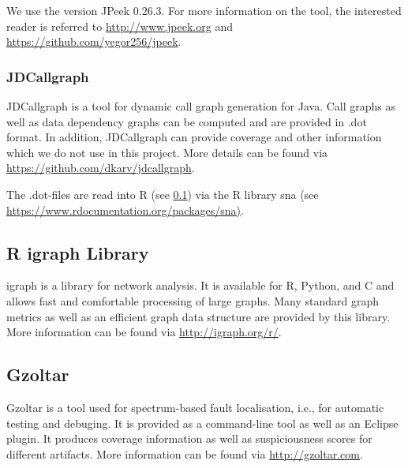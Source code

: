\documentclass{scrartcl}
\begin{document}
We use the version JPeek 0.26.3. For more information on the tool, the
interested reader is referred to \url{http://www.jpeek.org} and
\url{https://github.com/yegor256/jpeek}.

\subsubsection{JDCallgraph}
\label{sec:jdcallgraph}

JDCallgraph is a tool for dynamic call graph generation for Java. Call graphs as
well as data dependency graphs can be computed and are provided in .dot format.
In addition, JDCallgraph can provide coverage and other information which we do
not use in this project. More details can be found via
\url{https://github.com/dkarv/jdcallgraph}.

The .dot-files are read into R (see \ref{sec:igraph}) via the R library sna (see
\url{https://www.rdocumentation.org/packages/sna)}.

\subsection{R igraph Library}
\label{sec:igraph}

igraph is a library for network analysis. It is available for R, Python, and C
and allows fast and comfortable processing of large graphs. Many standard graph
metrics as well as an efficient graph data structure  are provided by this
library. More information can be found via \url{http://igraph.org/r/}.

\subsection{Gzoltar}
\label{sec:gzoltar}

Gzoltar is a tool used for spectrum-based fault localisation, i.e., for
automatic testing and debuging. It is provided as a command-line tool as well as
an Eclipse plugin. It produces coverage information as well as suspiciousness
scores for different artifacts. More information can be found via
\url{http://gzoltar.com}.
\end{document}
